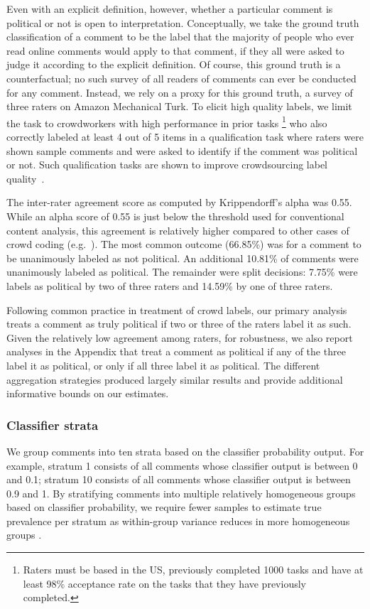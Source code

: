 \documentclass[letterpaper]{article} %
\begin{document}
Even with an explicit definition, however, whether a particular comment is political or not is open to interpretation. Conceptually, we take the ground truth classification of a comment to be the label that the majority of people who ever read online comments would apply to that comment, if they all were asked to judge it according to the explicit definition.
Of course, this ground truth is a counterfactual; no such survey of all readers of comments can ever be conducted for any comment. Instead, we rely on a proxy for this ground truth, a survey of three raters on Amazon Mechanical Turk. To elicit high quality labels, we limit the task to crowdworkers with high performance in prior tasks \footnote{Raters must be based in the US, previously completed 1000 tasks and have at least 98\% acceptance rate on the tasks that they have previously completed.} who also correctly labeled at least 4 out of 5 items in a qualification task where raters were shown sample comments and were asked to identify if the comment was political or not. Such qualification tasks are shown to improve crowdsourcing label quality~\cite{budak2016fair}.


The inter-rater agreement score as computed by Krippendorff's alpha was 0.55. While an alpha score of 0.55 is just below the threshold used for conventional content analysis, this agreement is relatively higher compared to other cases of crowd coding (e.g.~\cite{lind2017content}). The most common outcome (66.85\%) was for a comment to be unanimously labeled as not political. An additional 10.81\% of comments were unanimously labeled as political. The remainder were split decisions: 7.75\% were labels as political by two of three raters and 14.59\% by one of three raters. 

Following common practice in treatment of crowd labels, our primary analysis treats a comment as truly political if two or three of the raters label it as such. Given the relatively low agreement among raters, for robustness, we also report analyses in the Appendix that treat a comment as political if any of the three label it as political, or only if all three label it as political. The different aggregation strategies produced largely similar results and provide additional informative bounds on our estimates.

\subsubsection{Classifier strata}

We group comments into ten strata based on the classifier probability output. For example, stratum 1 consists of all comments whose classifier output is between 0 and 0.1; stratum 10 consists of all comments whose classifier output is between 0.9 and 1. By stratifying comments into multiple relatively homogeneous groups based on classifier probability, we require fewer samples to estimate true prevalence per stratum as within-group variance reduces in more homogeneous groups \cite{Cochran_1977}. 
\end{document}
